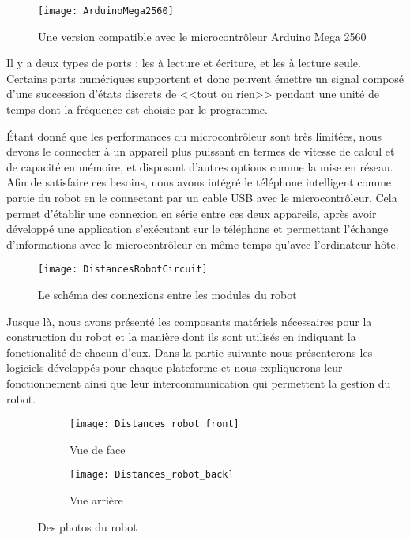 \begin{figure}[h]
\begin{center}
\texttt{[image: ArduinoMega2560]}
\caption{Une version compatible avec le microcontrôleur Arduino Mega 2560}
\end{center}
\end{figure}

Il y a deux types de ports : les  à lecture et
écriture, et les  à lecture seule. Certains ports
numériques supportent  et donc peuvent
émettre un signal composé d'une succession d'états discrets de <<tout ou rien>>
pendant une unité de temps dont la fréquence est choisie par le programme.

Étant donné que les performances du microcontrôleur sont très limitées, nous
devons le connecter à un appareil plus puissant en termes de vitesse
de calcul et de capacité en mémoire, et disposant d'autres options comme la
mise en réseau. Afin de satisfaire ces besoins, nous avons intégré le téléphone
intelligent  comme partie du robot en le connectant
par un cable USB avec le microcontrôleur. Cela permet d'établir une connexion en série entre
ces deux appareils, après avoir développé une application s'exécutant
sur le téléphone et permettant l'échange d'informations avec le microcontrôleur
en même temps qu'avec l'ordinateur hôte.

\begin{figure}[H]
\begin{center}
\texttt{[image: DistancesRobotCircuit]}
\caption{Le schéma des connexions entre les modules du robot}
\end{center}
\end{figure}

Jusque là, nous avons présenté les composants matériels nécessaires pour la
construction du robot et la manière dont ils sont utilisés en indiquant la
fonctionalité de chacun d'eux. Dans la partie suivante nous présenterons les
logiciels développés pour chaque plateforme et nous expliquerons leur fonctionnement
ainsi que leur intercommunication qui permettent la gestion du robot.

\begin{figure}[h]
\begin{center}
  \begin{subfigure}{0.49\textwidth}
    \texttt{[image: Distances\_robot\_front]}
    \caption{Vue de face}
  \end{subfigure}
  \hfill
  \begin{subfigure}{0.49\textwidth}
    \texttt{[image: Distances\_robot\_back]}
    \caption{Vue arrière}
  \end{subfigure}
  \caption{Des photos du robot}
\end{center}
\end{figure}

